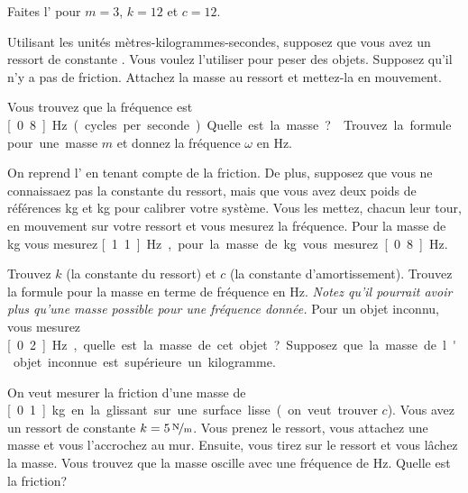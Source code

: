 \begin{exercise}
Faites l' pour
$m=3$, $k=12$ et $c=12$.
\end{exercise}

\begin{exercise} \label{mv:exwt1}
Utilisant les unités mètres-kilogrammes-secondes,
supposez que vous avez un ressort de constante  .
Vous voulez l'utiliser pour peser des objets. Supposez qu'il n'y a pas de friction. Attachez la masse au ressort et mettez-la en mouvement.  
\begin{tasks}
\task Vous trouvez que la fréquence est \unit[0.8]{Hz} (cycles per seconde).  Quelle est la masse?
\task Trouvez la formule pour une masse  $m$ et donnez la fréquence $\omega$ en \unit{Hz}.
\end{tasks}
\end{exercise}

\begin{exercise}
On reprend l' en tenant compte de la friction.
De plus, supposez que vous ne connaissaez pas la constante du ressort, mais que vous avez deux poids de références  \unit[1]{kg} et \unit[2]{kg} pour calibrer votre système.
Vous les mettez, chacun leur tour, en mouvement sur votre ressort et vous mesurez la fréquence. Pour la masse de  \unit[1]{kg} vous mesurez \unit[1.1]{Hz}, pour la masse de  \unit[2]{kg} vous mesurez \unit[0.8]{Hz}.
\begin{tasks}
\task Trouvez $k$ (la constante du ressort) et $c$ (la constante d'amortissement).
\task Trouvez la formule pour la masse en terme de fréquence en Hz.  \emph{Notez qu'il pourrait avoir plus qu'une masse possible pour une fréquence donnée.}
\task Pour un objet inconnu, vous mesurez \unit[0.2]{Hz}, quelle est la masse de cet objet?   Supposez que la masse de l'objet inconnue est supérieure un kilogramme.
\end{tasks}
\end{exercise}

\begin{exercise}
On veut mesurer la friction d'une masse de  \unit[0.1]{kg} en la glissant sur une surface lisse (on veut trouver $c$).  Vous avez un ressort de constante  $k=\unitfrac[5]{N}{m}$.  Vous prenez le ressort, vous attachez une masse et vous l'accrochez au mur. Ensuite, vous tirez sur le ressort et vous lâchez la masse. Vous trouvez que la masse oscille avec une fréquence de  \unit[1]{Hz}.
Quelle est la friction?
\end{exercise}

